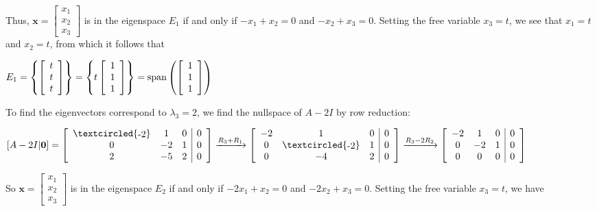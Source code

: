 \documentclass[
  letterpaper,
  DIV=11,
  numbers=noendperiod]{scrartcl}
\theoremstyle{remark}
\begin{document}
Thus,
\(\mathbf{x} = \left[\begin{array}{c} x_{1} \\ x_{2} \\ x_{3} \end{array}\right]\)
is in the eigenspace \(E_{1}\) if and only if \(-x_{1} + x_{2} = 0\) and
\(-x_{2} + x_{3} = 0\). Setting the free variable \(x_{3} = t\), we see
that \(x_{1} = t\) and \(x_{2} = t\), from which it follows that

\(E_{1} = \left\{\left[\begin{array}{c} t \\ t \\ t \end{array}\right]\right\} = \left\{t \left[\begin{array}{c} 1 \\ 1 \\ 1 \end{array}\right]\right\} = {\rm span}\left(\left[\begin{array}{c} 1 \\ 1 \\ 1 \end{array}\right]\right)\)

To find the eigenvectors correspond to \(\lambda _{3} = 2\), we find the
nullspace of \(A - 2I\) by row reduction:

\(\left[A - 2I | \mathbf{0}\right] = \left[\begin{array}{ccc | c} \textcircled{\raisebox{-0.9pt}{-2}} & 1 & 0 & 0 \\ 0 & -2 & 1 & 0 \\ 2 & -5 & 2 & 0 \end{array}\right] \xrightarrow{R_{3} + R_{1}} \left[\begin{array}{ccc | c} -2 & 1 & 0 & 0 \\ 0 & \textcircled{\raisebox{-0.9pt}{-2}} & 1 & 0 \\ 0 & -4 & 2 & 0 \end{array}\right] \xrightarrow{R_{3} - 2R_{2}} \left[\begin{array}{ccc | c} -2 & 1 & 0 & 0 \\ 0 & -2 & 1 & 0 \\ 0 & 0 & 0 & 0 \end{array}\right]\)

So
\(\mathbf{x} = \left[\begin{array}{c} x_{1} \\ x_{2} \\ x_{3} \end{array}\right]\)
is in the eigenspace \(E_{2}\) if and only if \(-2x_{1} + x_{2} = 0\)
and \(-2x_{2} + x_{3} = 0\). Setting the free variable \(x_{3} = t\), we
have
\end{document}
